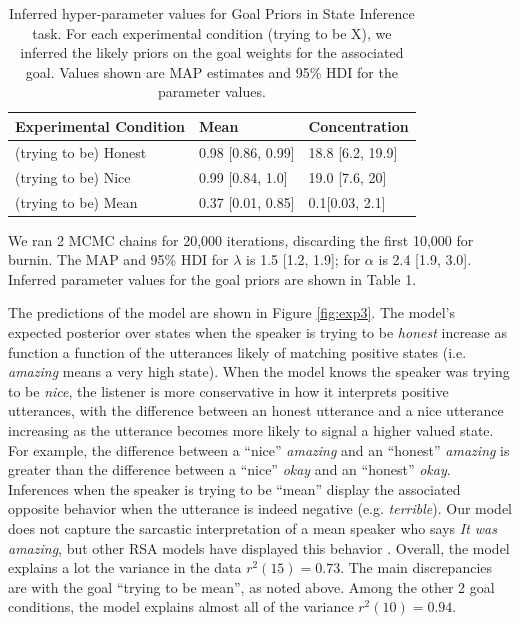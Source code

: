 \documentclass[10pt,letterpaper]{article}
\newcommand{\red}[1]{\textcolor{Red}{#1}}
\newcommand{\mht}[1]{\textcolor{DarkOrange}{[mht: #1]}}
\begin{document}
\begin{table}[]
\label{my-table}
\begin{tabular}{lll}
\hline
Experimental Condition  & Mean & Concentration \\ \hline
(trying to be) Honest                        &   0.98 [0.86, 0.99]   & 18.8 [6.2, 19.9] \\
(trying to be) Nice                          & 0.99 [0.84, 1.0] & 19.0 [7.6, 20] \\
(trying to be) Mean                          &0.37 [0.01, 0.85] & 0.1[0.03, 2.1] \\ \hline
\end{tabular}
\caption{Inferred hyper-parameter values for Goal Priors in State Inference task.
For each experimental condition (trying to be X), we inferred the likely priors on the goal weights for the associated goal.
Values shown are MAP estimates and 95\% HDI for the parameter values.}
\end{table}
We ran 2 MCMC chains for 20,000 iterations, discarding the first 10,000 for burnin.
The MAP and 95\% HDI for $\lambda$ is 1.5 [1.2, 1.9]; for $\alpha$ is 2.4 [1.9, 3.0]. %
Inferred parameter values for the goal priors are shown in Table 1.

The predictions of the model are shown in Figure \ref{fig:exp3}.
The model's expected posterior over states when the speaker is trying to be \emph{honest} increase as function a function of the utterances likely of matching positive states (i.e. \emph{amazing} means a very high state).
When the model knows the speaker was trying to be \emph{nice}, the listener is more conservative in how it interprets positive utterances, with the difference between an honest utterance and a nice utterance increasing as the utterance becomes more likely to signal a higher valued state. 
For example, the difference between a ``nice'' \emph{amazing} and an ``honest'' \emph{amazing} is greater than the difference between a ``nice'' \emph{okay} and an ``honest'' \emph{okay}.
Inferences when the speaker is trying to be ``mean'' display the associated opposite behavior when the utterance is indeed negative (e.g. \emph{terrible}).
Our model does not capture the sarcastic interpretation of a mean speaker who says \emph{It was amazing}, but other RSA models have displayed this behavior \cite{Kao2015}.%
Overall, the model explains a lot the variance in the data $r^2(15) = 0.73$. 
The main discrepancies are with the goal ``trying to be mean'', as noted above. 
Among the other 2 goal conditions, the model explains almost all of the variance $r^2(10) = 0.94$. 
\end{document}
